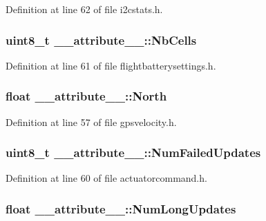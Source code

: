 \-Definition at line 62 of file i2cstats.\-h.

\hypertarget{struct____attribute_____a33c95d5352c0109fc23b5c5aaafadba3}{
\subsubsection[{\-Nb\-Cells}]{\setlength{\rightskip}{0pt plus 5cm}uint8\-\_\-t {\bf \-\_\-\-\_\-attribute\-\_\-\-\_\-\-::\-Nb\-Cells}}}\label{struct____attribute_____a33c95d5352c0109fc23b5c5aaafadba3}


\-Definition at line 61 of file flightbatterysettings.\-h.

\hypertarget{struct____attribute_____af07f085a1e47ef36bfc8cea372caa47b}{
\subsubsection[{\-North}]{\setlength{\rightskip}{0pt plus 5cm}float {\bf \-\_\-\-\_\-attribute\-\_\-\-\_\-\-::\-North}}}\label{struct____attribute_____af07f085a1e47ef36bfc8cea372caa47b}


\-Definition at line 57 of file gpsvelocity.\-h.

\hypertarget{struct____attribute_____a15b4aa3fdb1c15c0842d77e8efff2f8d}{
\subsubsection[{\-Num\-Failed\-Updates}]{\setlength{\rightskip}{0pt plus 5cm}uint8\-\_\-t {\bf \-\_\-\-\_\-attribute\-\_\-\-\_\-\-::\-Num\-Failed\-Updates}}}\label{struct____attribute_____a15b4aa3fdb1c15c0842d77e8efff2f8d}


\-Definition at line 60 of file actuatorcommand.\-h.

\hypertarget{struct____attribute_____a6b5a3b7424676ea01c606d47ce6d9225}{
\subsubsection[{\-Num\-Long\-Updates}]{\setlength{\rightskip}{0pt plus 5cm}float {\bf \-\_\-\-\_\-attribute\-\_\-\-\_\-\-::\-Num\-Long\-Updates}}}\label{struct____attribute_____a6b5a3b7424676ea01c606d47ce6d9225}


